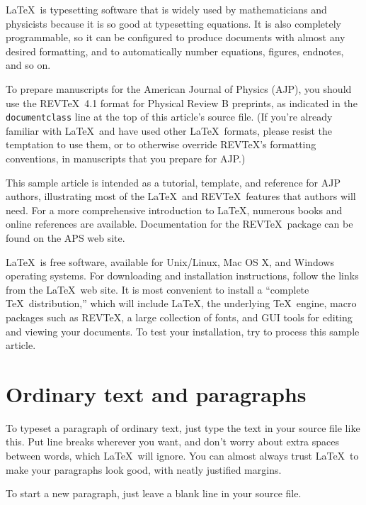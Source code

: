 \documentclass[prb,preprint]{revtex4-2}
\begin{document}
\LaTeX\ is typesetting software that is widely used by mathematicians
and physicists because it is so good at typesetting equations. It is 
also completely programmable, so it can be configured to produce 
documents with almost any desired formatting, and to automatically
number equations, figures, endnotes, and so on.

To prepare manuscripts for the American Journal of Physics (AJP), 
you should use the REV\TeX\ 4.1 format for Physical Review B
preprints, as indicated in the \texttt{documentclass} line at the top 
of this article's source file.  (If you're already familiar with 
\LaTeX\ and have used other \LaTeX\ formats, please resist the 
temptation to use them, or to otherwise override REV\TeX's formatting 
conventions, in manuscripts that you prepare for AJP.)

This sample article is intended as a tutorial, template, and reference for 
AJP authors, illustrating most of the \LaTeX\ and REV\TeX\ features that 
authors will need.  For a more comprehensive introduction to \LaTeX, 
numerous books and online references are available.\cite{latexsite, 
wikibook, latexbook}  Documentation for the REV\TeX\ package 
can be found on the APS web site.\cite{revtex}

\LaTeX\ is free software, available for Unix/Linux, Mac OS X, and Windows
operating systems. For downloading and installation instructions, follow
the links from the \LaTeX\ web site.\cite{latexsite} It is most
convenient\cite{cloudLaTeX} to install a ``complete \TeX\ distribution,'' 
which will include \LaTeX, the underlying \TeX\ engine, macro packages 
such as REV\TeX, a large collection of fonts, and GUI tools for editing 
and viewing your documents.  To test your installation, try to process
this sample article.


\section{Ordinary text and paragraphs}

To typeset a paragraph of ordinary text, just type the text in your source
file like this. Put line breaks
wherever
you
want, and don't      worry      about      extra      spaces      between      words, which \LaTeX\ will ignore.  You can almost always trust \LaTeX\ to make your paragraphs look good, with neatly justified margins.  %

To start a new paragraph, just leave a blank line in your source file.
\end{document}
